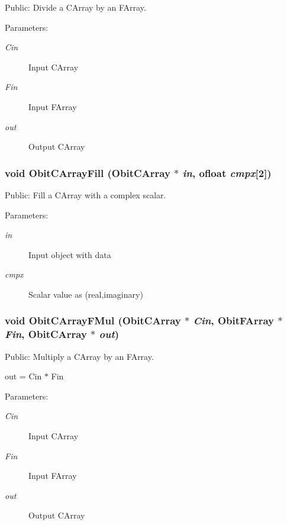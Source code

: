 Public: Divide a CArray by an FArray. 

\begin{Desc}
\item[Parameters:]
\begin{description}
\item[{\em Cin}]Input CArray \item[{\em Fin}]Input FArray \item[{\em out}]Output CArray \end{description}
\end{Desc}
\subsubsection{\setlength{\rightskip}{0pt plus 5cm}void Obit\-CArray\-Fill ({\bf Obit\-CArray} $\ast$ {\em in}, {\bf ofloat} {\em cmpx}[2])}\label{ObitCArray_8c_a17}


Public: Fill a CArray with a complex scalar. 

\begin{Desc}
\item[Parameters:]
\begin{description}
\item[{\em in}]Input object with data \item[{\em cmpx}]Scalar value as (real,imaginary) \end{description}
\end{Desc}
\subsubsection{\setlength{\rightskip}{0pt plus 5cm}void Obit\-CArray\-FMul ({\bf Obit\-CArray} $\ast$ {\em Cin}, {\bf Obit\-FArray} $\ast$ {\em Fin}, {\bf Obit\-CArray} $\ast$ {\em out})}\label{ObitCArray_8c_a29}


Public: Multiply a CArray by an FArray. 

out = Cin $\ast$ Fin \begin{Desc}
\item[Parameters:]
\begin{description}
\item[{\em Cin}]Input CArray \item[{\em Fin}]Input FArray \item[{\em out}]Output CArray \end{description}
\end{Desc}
